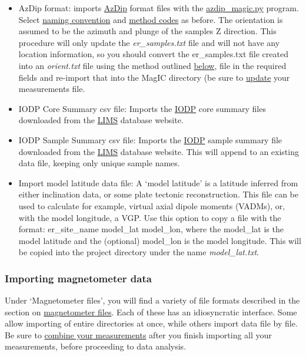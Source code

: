 \documentclass[11pt]{book}
\begin{document}
{\begin{itemize}
 \item AzDip format:  imports \href{#AZDIP}{AzDip} format files with the \href{#azdip_magic.py}{azdip\_magic.py} program.  Select \href{naming_schemes}{naming convention} and  \href{#method_codes}{method codes} as before.  The orientation is assumed to be the azimuth and plunge of the samples Z direction.  This procedure will only update the {\it er\_samples.txt} file and will not have any location information, so you should convert the er\_samples.txt file created into an {\it orient.txt} file using  the method outlined \href{#samp2orient}{below}, file in the required fields and re-import that into the MagIC directory (be sure to \href{#updatemeas}{update} your measurements file.
  \item IODP Core Summary csv file: Imports the \href{#LIMS}{IODP} core summary files downloaded from the \href{http://web.iodp.tamu.edu/WTR/html/}{LIMS} database website.
 \item IODP Sample Summary csv file: Imports the \href{#LIMS}{IODP} sample summary file downloaded from the \href{http://web.iodp.tamu.edu/WTR/html/}{LIMS} database website.   This will append to an existing data file, keeping only unique sample names.
 \item Import model latitude data file:  A `model latitude' is a latitude inferred from either inclination data, or some plate tectonic reconstruction.  This file can be used to calculate for example, virtual axial dipole moments (VADMs), or, with the model longitude, a VGP.  Use this option to copy a file with the format:
 er\_site\_name   model\_lat   model\_lon, where the model\_lat is the model latitude and the (optional) model\_lon is the model longitude.  This will be copied into the project directory under the name {\it model\_lat.txt}.  
\end{itemize}
 

 \subsubsection{Importing magnetometer data}
 
Under `Magnetometer files', you will find a variety of  file formats described in the section on
\href{#magnetometer_files}{magnetometer files}.
Each of these has an idiosyncratic interface.  Some allow importing of entire directories at once, while others import data file by file.   Be sure to \href{#combine_measurements}{combine your measurements} after you finish importing all your measurements, before proceeding to data analysis. 


}
\end{document}
